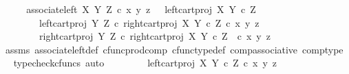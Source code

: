 \begin{isabellebody}
%
\isadelimproof
%
\endisadelimproof
%
\isatagproof
{}\isamarkupfalse%
\ {\isacharminus}{\kern0pt}\isanewline
\ \ \isamarkupfalse%
\ {\isachardoublequoteopen}associate{\isacharunderscore}{\kern0pt}left\ X\ Y\ Z\ {\isasymcirc}\isactrlsub c\ {\isasymlangle}x{\isacharcomma}{\kern0pt}\ {\isasymlangle}y{\isacharcomma}{\kern0pt}\ z{\isasymrangle}{\isasymrangle}\ \ {\isacharequal}{\kern0pt}\ {\isasymlangle}{\isasymlangle}left{\isacharunderscore}{\kern0pt}cart{\isacharunderscore}{\kern0pt}proj\ X\ {\isacharparenleft}{\kern0pt}Y\ {\isasymtimes}\isactrlsub c\ Z{\isacharparenright}{\kern0pt}{\isacharcomma}{\kern0pt}\isanewline
\ \ \ \ \ \ \ \ left{\isacharunderscore}{\kern0pt}cart{\isacharunderscore}{\kern0pt}proj\ Y\ Z\ {\isasymcirc}\isactrlsub c\ right{\isacharunderscore}{\kern0pt}cart{\isacharunderscore}{\kern0pt}proj\ X\ {\isacharparenleft}{\kern0pt}Y\ {\isasymtimes}\isactrlsub c\ Z{\isacharparenright}{\kern0pt}{\isasymrangle}\ {\isasymcirc}\isactrlsub c\ {\isasymlangle}x{\isacharcomma}{\kern0pt}\ {\isasymlangle}y{\isacharcomma}{\kern0pt}\ z{\isasymrangle}{\isasymrangle}{\isacharcomma}{\kern0pt}\isanewline
\ \ \ \ \ \ \ \ right{\isacharunderscore}{\kern0pt}cart{\isacharunderscore}{\kern0pt}proj\ Y\ Z\ {\isasymcirc}\isactrlsub c\ right{\isacharunderscore}{\kern0pt}cart{\isacharunderscore}{\kern0pt}proj\ X\ {\isacharparenleft}{\kern0pt}Y\ {\isasymtimes}\isactrlsub c\ Z{\isacharparenright}{\kern0pt}\ \ {\isasymcirc}\isactrlsub c\ {\isasymlangle}x{\isacharcomma}{\kern0pt}\ {\isasymlangle}y{\isacharcomma}{\kern0pt}\ z{\isasymrangle}{\isasymrangle}{\isasymrangle}{\isachardoublequoteclose}\isanewline
\ \ \ \ \isamarkupfalse%
\ assms\ associate{\isacharunderscore}{\kern0pt}left{\isacharunderscore}{\kern0pt}def\ cfunc{\isacharunderscore}{\kern0pt}prod{\isacharunderscore}{\kern0pt}comp\ cfunc{\isacharunderscore}{\kern0pt}type{\isacharunderscore}{\kern0pt}def\ comp{\isacharunderscore}{\kern0pt}associative\ comp{\isacharunderscore}{\kern0pt}type\ \isamarkupfalse%
\ {\isacharparenleft}{\kern0pt}typecheck{\isacharunderscore}{\kern0pt}cfuncs{\isacharcomma}{\kern0pt}\ auto{\isacharparenright}{\kern0pt}\isanewline
\ \ \isamarkupfalse%
\ \isamarkupfalse%
\ {\isachardoublequoteopen}{\isachardot}{\kern0pt}{\isachardot}{\kern0pt}{\isachardot}{\kern0pt}\ {\isacharequal}{\kern0pt}\ {\isasymlangle}\ {\isasymlangle}left{\isacharunderscore}{\kern0pt}cart{\isacharunderscore}{\kern0pt}proj\ X\ {\isacharparenleft}{\kern0pt}Y\ {\isasymtimes}\isactrlsub c\ Z{\isacharparenright}{\kern0pt}\ {\isasymcirc}\isactrlsub c\ {\isasymlangle}x{\isacharcomma}{\kern0pt}\ {\isasymlangle}y{\isacharcomma}{\kern0pt}\ z{\isasymrangle}{\isasymrangle}{\isacharcomma}{\kern0pt}\isanewline

\end{isabellebody}
